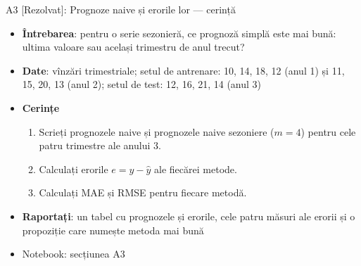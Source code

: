 \begin{frame}{A3 [Rezolvat]: Prognoze naive și erorile lor --- cerință}
\itemsize{\small}
\begin{itemize}
\item \textbf{Întrebarea}: pentru o serie sezonieră, ce prognoză simplă este mai bună: ultima valoare sau același trimestru de anul trecut?
\item \textbf{Date}: vînzări trimestriale; setul de antrenare: 10, 14, 18, 12 (anul 1) și 11, 15, 20, 13 (anul 2); setul de test: 12, 16, 21, 14 (anul 3)
\item \textbf{Cerințe}
\begin{enumerate}
    \item Scrieți prognozele naive și prognozele naive sezoniere ($m = 4$) pentru cele patru trimestre ale anului 3.
    \item Calculați erorile $e = y - \hat y$ ale fiecărei metode.
    \item Calculați MAE și RMSE pentru fiecare metodă.
\end{enumerate}
\item \textbf{Raportați}: un tabel cu prognozele și erorile, cele patru măsuri ale erorii și o propoziție care numește metoda mai bună
\item Notebook: secțiunea A3
\end{itemize}
\end{frame}

